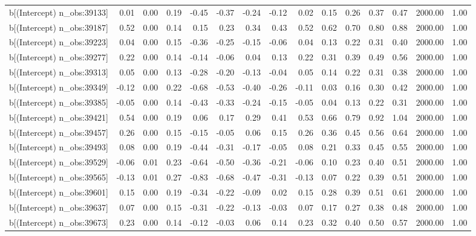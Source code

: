\begin{table}[ht]
\begin{tabular}{rrrrrrrrrrrrrrr}
  b[(Intercept) n\_obs:39133] & 0.01 & 0.00 & 0.19 & -0.45 & -0.37 & -0.24 & -0.12 & 0.02 & 0.15 & 0.26 & 0.37 & 0.47 & 2000.00 & 1.00 \\ 
  b[(Intercept) n\_obs:39187] & 0.52 & 0.00 & 0.14 & 0.15 & 0.23 & 0.34 & 0.43 & 0.52 & 0.62 & 0.70 & 0.80 & 0.88 & 2000.00 & 1.00 \\ 
  b[(Intercept) n\_obs:39223] & 0.04 & 0.00 & 0.15 & -0.36 & -0.25 & -0.15 & -0.06 & 0.04 & 0.13 & 0.22 & 0.31 & 0.40 & 2000.00 & 1.00 \\ 
  b[(Intercept) n\_obs:39277] & 0.22 & 0.00 & 0.14 & -0.14 & -0.06 & 0.04 & 0.13 & 0.22 & 0.31 & 0.39 & 0.49 & 0.56 & 2000.00 & 1.00 \\ 
  b[(Intercept) n\_obs:39313] & 0.05 & 0.00 & 0.13 & -0.28 & -0.20 & -0.13 & -0.04 & 0.05 & 0.14 & 0.22 & 0.31 & 0.38 & 2000.00 & 1.00 \\ 
  b[(Intercept) n\_obs:39349] & -0.12 & 0.00 & 0.22 & -0.68 & -0.53 & -0.40 & -0.26 & -0.11 & 0.03 & 0.16 & 0.30 & 0.42 & 2000.00 & 1.00 \\ 
  b[(Intercept) n\_obs:39385] & -0.05 & 0.00 & 0.14 & -0.43 & -0.33 & -0.24 & -0.15 & -0.05 & 0.04 & 0.13 & 0.22 & 0.31 & 2000.00 & 1.00 \\ 
  b[(Intercept) n\_obs:39421] & 0.54 & 0.00 & 0.19 & 0.06 & 0.17 & 0.29 & 0.41 & 0.53 & 0.66 & 0.79 & 0.92 & 1.04 & 2000.00 & 1.00 \\ 
  b[(Intercept) n\_obs:39457] & 0.26 & 0.00 & 0.15 & -0.15 & -0.05 & 0.06 & 0.15 & 0.26 & 0.36 & 0.45 & 0.56 & 0.64 & 2000.00 & 1.00 \\ 
  b[(Intercept) n\_obs:39493] & 0.08 & 0.00 & 0.19 & -0.44 & -0.31 & -0.17 & -0.05 & 0.08 & 0.21 & 0.33 & 0.45 & 0.55 & 2000.00 & 1.00 \\ 
  b[(Intercept) n\_obs:39529] & -0.06 & 0.01 & 0.23 & -0.64 & -0.50 & -0.36 & -0.21 & -0.06 & 0.10 & 0.23 & 0.40 & 0.51 & 2000.00 & 1.00 \\ 
  b[(Intercept) n\_obs:39565] & -0.13 & 0.01 & 0.27 & -0.83 & -0.68 & -0.47 & -0.31 & -0.13 & 0.07 & 0.22 & 0.39 & 0.51 & 2000.00 & 1.00 \\ 
  b[(Intercept) n\_obs:39601] & 0.15 & 0.00 & 0.19 & -0.34 & -0.22 & -0.09 & 0.02 & 0.15 & 0.28 & 0.39 & 0.51 & 0.61 & 2000.00 & 1.00 \\ 
  b[(Intercept) n\_obs:39637] & 0.07 & 0.00 & 0.15 & -0.31 & -0.22 & -0.13 & -0.03 & 0.07 & 0.17 & 0.27 & 0.38 & 0.48 & 2000.00 & 1.00 \\ 
  b[(Intercept) n\_obs:39673] & 0.23 & 0.00 & 0.14 & -0.12 & -0.03 & 0.06 & 0.14 & 0.23 & 0.32 & 0.40 & 0.50 & 0.57 & 2000.00 & 1.00 \\ 

\end{tabular}
\end{table}

